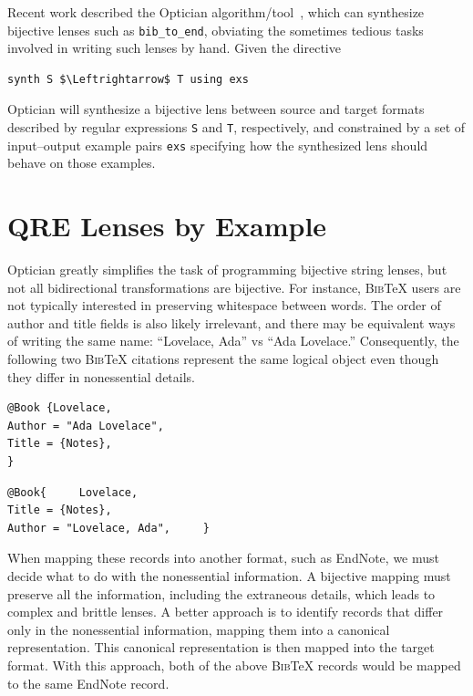 \documentclass[acmsmall,screen]{acmart}
\newcommand{\bibtex}{\textsc{Bib}\TeX{}}
\newcommand{\cd}[1]{\lstinline[backgroundcolor=\color{white}]$#1$}
\begin{document}
Recent work described the Optician
algorithm/tool~\cite{miltner2017synthesizing}, which can synthesize bijective lenses
such as \cd{bib_to_end}, obviating the sometimes tedious tasks
involved in writing such lenses by hand.  Given the directive
\begin{lstlisting}
synth S $\Leftrightarrow$ T using exs
\end{lstlisting}
\noindent
Optician will synthesize a bijective lens between 
source and target formats described by regular expressions
\cd{S} and \cd{T}, respectively, and constrained by a set of input--output example pairs \cd{exs} specifying how
the synthesized lens should behave on those examples.


\section{QRE Lenses by Example}
\label{sec:example}

Optician greatly simplifies the task of programming bijective
string lenses, but not all bidirectional transformations are
bijective.  For instance, \bibtex{} users are not typically interested
in preserving whitespace between words.  The order of author and title
fields is also likely irrelevant, and there may be equivalent ways of
writing the same name: ``Lovelace, Ada'' vs ``Ada Lovelace.''
Consequently, the following two \bibtex{} citations represent the same
logical object even though they differ in nonessential details.

\begin{center}
  \begin{minipage}{2.2in}
    \centering
\begin{verbatim}
@Book {Lovelace,
Author = "Ada Lovelace",
Title = {Notes},
}
\end{verbatim}
  \end{minipage}
  \begin{minipage}{2in}
    \centering
\begin{verbatim}
@Book{     Lovelace,
Title = {Notes},
Author = "Lovelace, Ada",     }
\end{verbatim}
  \end{minipage}
\end{center}

When mapping these records into another format, such as EndNote, we
must decide what to do with the nonessential information.  A bijective
mapping must preserve all the information, including the extraneous
details, which leads to complex and brittle lenses.
A better approach is to identify records that differ only in the
nonessential information, mapping them into a canonical representation.
This canonical representation is then mapped into the target format.
With this approach, both of the above \bibtex{} records would be
mapped to the same EndNote record.
\end{document}
